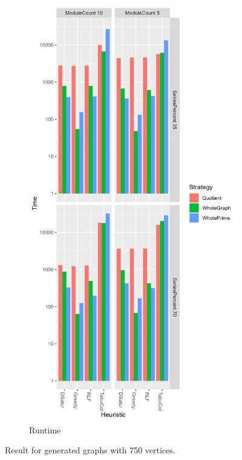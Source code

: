\documentclass[a4paper]{article}
\begin{document}
\begin{figure}[p]
\begin{subfigure}{\resultbase}
    \end{subfigure}%
    \begin{subfigure}{\resultbase}
        \includegraphics[width=\columnwidth]{Tables/750Time.png}
      \caption{Runtime}
      \label{fig:750t}
    \end{subfigure}
\caption{Result for generated graphs with 750 vertices. \facfigdesc }
\label{fig:750}
\end{figure}
\end{document}

